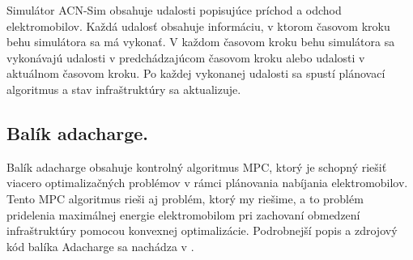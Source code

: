 Simulátor ACN-Sim obsahuje udalosti popisujúce príchod a odchod elektromobilov. Každá udalosť obsahuje informáciu, v ktorom časovom kroku behu simulátora sa má vykonať. V každom časovom kroku behu simulátora sa vykonávajú udalosti v predchádzajúcom časovom kroku alebo udalosti v aktuálnom časovom kroku. Po každej vykonanej udalosti sa spustí plánovací algoritmus a stav infraštruktúry sa aktualizuje. \cite{lee2021acnsim}









\subsection{Balík adacharge.}
Balík adacharge obsahuje kontrolný algoritmus MPC, ktorý je schopný riešiť viacero optimalizačných problémov v rámci plánovania nabíjania elektromobilov. Tento MPC algoritmus rieši aj problém, ktorý my riešime, a to problém pridelenia maximálnej energie elektromobilom pri zachovaní obmedzení infraštruktúry pomocou konvexnej optimalizácie. Podrobnejší popis a zdrojový kód balíka Adacharge sa nachádza v \cite{adachargerepository}.
